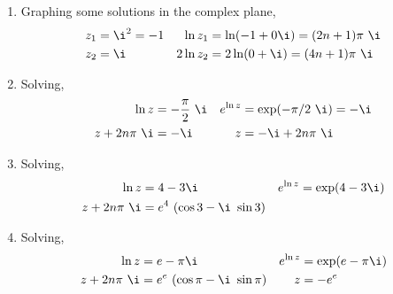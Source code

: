 \begin{enumerate}
    \item Graphing some solutions in the complex plane,
          \begin{align}
              z_1      & = \i^2 = -1                     &
              \ln z_1  & = \ln(-1 + 0\i) = (2n+1)\pi\ \i   \\
              z_2      & = \i                            &
              2\ln z_2 & = 2\ln(0 + \i) = (4n+1)\pi\ \i    \\
          \end{align}
          \begin{figure}[H]
              \centering
          \end{figure}

    \item Solving,
          \begin{align}
              \ln z         & = -\frac{\pi}{2}\ \i     &
              e^{\ln z}     & = \exp(-\pi/2\ \i) = -\i   \\
              z + 2n\pi\ \i & = -\i                    &
              z             & = -\i + 2n\pi\ \i
          \end{align}

    \item Solving,
          \begin{align}
              \ln z         & = 4 - 3\i                    &
              e^{\ln z}     & = \exp(4 - 3\i)                \\
              z + 2n\pi\ \i & = e^4\ (\cos 3 - \i\ \sin 3)
          \end{align}

    \item Solving,
          \begin{align}
              \ln z         & = e - \pi\i                      &
              e^{\ln z}     & = \exp(e - \pi\i)                  \\
              z + 2n\pi\ \i & = e^e\ (\cos \pi - \i\ \sin \pi) &
              z             & = -e^e
          \end{align}


\end{enumerate}
